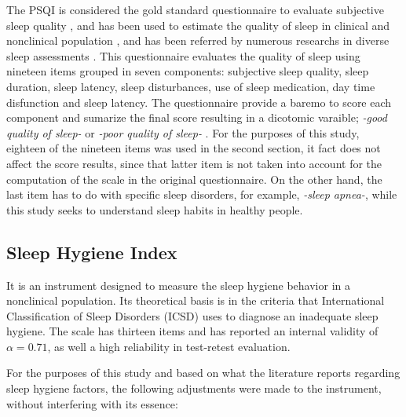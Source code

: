 \documentclass[]{book}
\begin{document}
The PSQI is considered the gold standard questionnaire to evaluate
subjective sleep quality \citep{Cameron2010}, and has been used to
estimate the quality of sleep in clinical and nonclinical population
\citep{mastin2006}, and has been referred by numerous researchs in
diverse sleep assessments \citep{bai2012}. This questionnaire evaluates
the quality of sleep using nineteen items grouped in seven components:
subjective sleep quality, sleep duration, sleep latency, sleep
disturbances, use of sleep medication, day time disfunction and sleep
latency. The questionnaire provide a baremo to score each component and
sumarize the final score resulting in a dicotomic varaible; \emph{-good
quality of sleep-} or \emph{-poor quality of sleep-} \citep{psqi1989}.
For the purposes of this study, eighteen of the nineteen items was used
in the second section, it fact does not affect the score results, since
that latter item is not taken into account for the computation of the
scale in the original questionnaire. On the other hand, the last item
has to do with specific sleep disorders, for example, \emph{-sleep
apnea-}, while this study seeks to understand sleep habits in healthy
people.

\subsection{Sleep Hygiene Index}\label{sleep-hygiene-index}

It is an instrument designed to measure the sleep hygiene behavior in a
nonclinical population. Its theoretical basis is in the criteria that
International Classification of Sleep Disorders (ICSD) uses to diagnose
an inadequate sleep hygiene. The scale has thirteen items and has
reported an internal validity of \(\alpha=0.71\), as well a high
reliability in test-retest evaluation\citep{mastin2006}.

For the purposes of this study and based on what the literature reports
regarding sleep hygiene factors, the following adjustments were made to
the instrument, without interfering with its essence:
\end{document}
